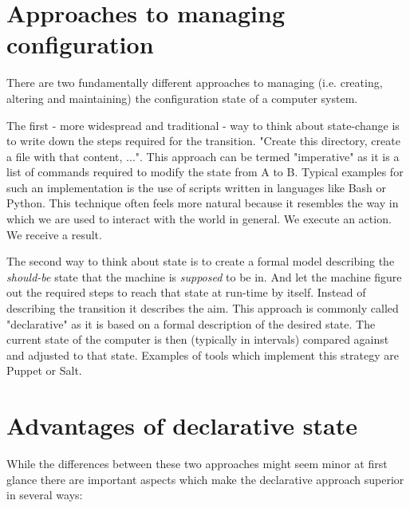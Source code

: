 \documentclass[12pt, a4paper]{article}
\begin{document}
\section{Approaches to managing configuration}
There are two fundamentally different approaches to managing (i.e. creating, altering and maintaining) the configuration state of a computer system.

The first - more widespread and traditional - way to think about state-change is to write down the steps required for the transition. "Create this directory, create a file with that content, ...". This approach can be termed "imperative" as it is a list of commands required to modify the state from A to B. Typical examples for such an implementation is the use of scripts written in languages like Bash or Python. This technique often feels more natural because it resembles the way in which we are used to interact with the world in general. We execute an action. We receive a result.

The second way to think about state is to create a formal model describing the \textit{should-be} state that the machine is \textit{supposed} to be in. And let the machine figure out the required steps to reach that state at run-time by itself. Instead of describing the transition it describes the aim. This approach is commonly called "declarative" as it is based on a formal description of the desired state. The current state of the computer is then (typically in intervals) compared against and adjusted to that state. Examples of tools which implement this strategy are Puppet or Salt.

\section{Advantages of declarative state}
While the differences between these two approaches might seem minor at first glance there are important aspects which make the declarative approach superior in several ways:
\end{document}

